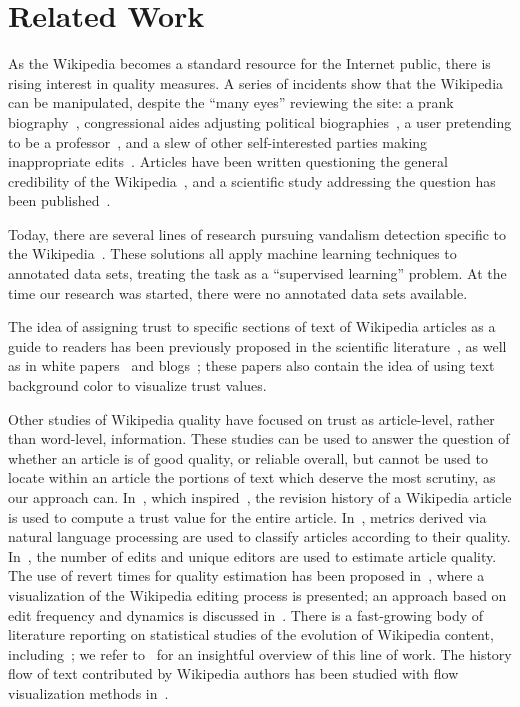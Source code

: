 \section{Related Work}

As the Wikipedia becomes a standard resource for the Internet
public, there is rising interest in quality measures.
A series of incidents show that the Wikipedia can be manipulated,
despite the ``many eyes'' reviewing the site:
a prank biography~\cite{Seigenthaler05,NewYorkTimes05a,NewYorkTimes05b},
congressional aides adjusting political
biographies~\cite{TheSun06,NewZelandHerald06,BBC06},
a user pretending to be a professor~\cite{BBC07},
and a slew of other self-interested parties making
inappropriate edits~\cite{Wired07,Wikiscanner07,NPR08}.
Articles have been written questioning the
general credibility of the Wikipedia~\cite{NewYorkTimes06,TheNewYorker06},
and a scientific study addressing the question
has been published~\cite{Giles05}.

Today, there are several lines of research pursuing
vandalism detection specific to the Wikipedia~\cite{Potthast2010b}.
These solutions all apply machine learning techniques
to annotated data sets, treating the task as a
``supervised learning'' problem.
At the time our research was started, there were no annotated
data sets available.


The idea of assigning trust to specific sections of text of Wikipedia
articles as a guide to readers has been previously proposed in the scientific
literature~\cite{WikiMTWtrust06,Cr06,McGuinness06}, as well as in white
papers~\cite{King07} and blogs~\cite{PaoloMassa07}; these papers also contain
the idea of using text background color to visualize trust values.


Other studies of Wikipedia quality have focused on trust as
article-level, rather than word-level, information.
These studies can be used to answer the question of whether an
article is of good quality, or reliable overall, but cannot be used to
locate within an article the portions of text which deserve the most
scrutiny, as our approach can.
In~\cite{WikiTrust06}, which inspired~\cite{McGuinness06}, the
revision history of a Wikipedia article is used to compute a trust
value for the entire article.
In~\cite{Emigh05b,Mingus07}, metrics derived via natural language processing
are used to classify articles according to their quality.
In~\cite{Lih04}, the number of edits and unique editors are used to
estimate article quality.
The use of revert times for quality estimation has been proposed
in~\cite{Viegas04}, where a visualization of the Wikipedia editing
process is presented; an approach based on edit frequency and dynamics
is discussed in~\cite{WilkinsonHuberman07}.
There is a fast-growing body of literature reporting on
statistical studies of the evolution of Wikipedia content,
including~\cite{Viegas04,Voss05,Ortega07}; we refer to~\cite{Ortega07} for an
insightful overview of this line of work.
The history flow of text contributed by Wikipedia authors has
been studied with flow visualization methods in~\cite{Viegas04}.

